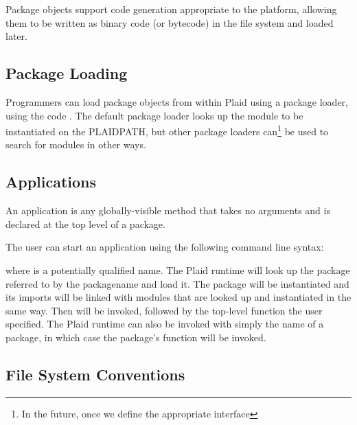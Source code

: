 Package objects support code generation appropriate to the platform,
allowing them to be written as binary code (or bytecode) in the file
system and loaded later.  




\subsection{Package Loading}

Programmers can load package objects from within Plaid using a package
loader, using the code .
The default package loader looks up the module to be instantiated on
the PLAIDPATH, but other package loaders can\footnote{In the future,
  once we define the appropriate interface} be used to search for
modules in other ways.




\subsection{Applications}

An application is any globally-visible method that takes no arguments
and is declared at the top level of a package.

\noindent
The user can start an application using the following command line
syntax:

\begin{quote}
\end{quote}

\noindent
where  is a potentially qualified name.  The
Plaid runtime will look up the package referred to by the packagename
and load it.  The package will be instantiated and its imports will be
linked with modules that are looked up and instantiated in the same
way.  Then  will be invoked, followed by the
top-level function the user specified.  The Plaid runtime can also be
invoked with simply the name of a package, in which case the package's
 function will be invoked.

\subsection{File System Conventions}

